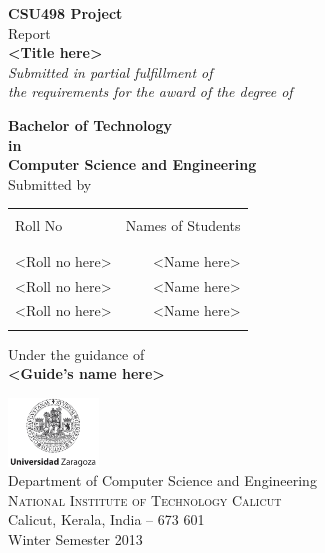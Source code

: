 \documentclass[a4paper,oneside]{report}
\begin{document}
\renewcommand\refname{References} %

\begin{titlepage}

\begin{center}

\textup{\small {\bf CSU498 Project} \\ Report}\\[0.2in]

\Large \textbf {<Title here>}\\[0.5in]

       \small \emph{Submitted in partial fulfillment of\\
        the requirements for the award of the degree of}
        \vspace{.2in}

       {\bf Bachelor of Technology \\in\\ Computer Science and Engineering}\\[0.5in]

\normalsize Submitted by \\
\begin{table}[h]
\centering
\begin{tabular}{lr}\hline \\
Roll No & Names of Students \\ \\ \hline
\\
<Roll no here> & <Name here> \\
<Roll no here> & <Name here> \\
<Roll no here> & <Name here> \\ \\ \hline
\end{tabular}
\end{table}

\vspace{.1in}
Under the guidance of\\
{\textbf{<Guide's name here>}}\\[0.2in]

\vfill

\includegraphics[width=0.18\textwidth]{images/logo.png}\\[0.1in]
\Large{Department of Computer Science and Engineering}\\
\normalsize
\textsc{National Institute of Technology Calicut}\\
Calicut, Kerala, India -- 673 601 \\
\vspace{0.2cm}
Winter Semester 2013

\end{center}

\end{titlepage}

\tableofcontents
\listoffigures

\newpage
{} %
\end{document}
